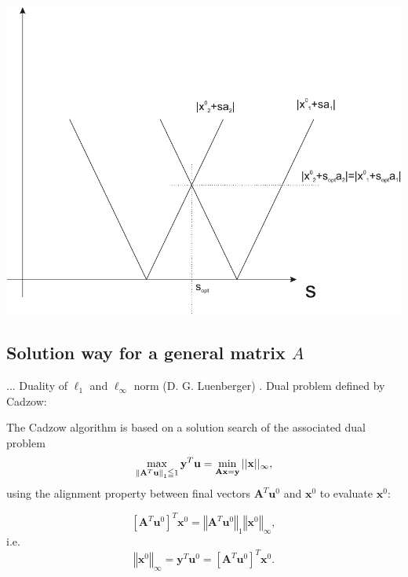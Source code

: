 \documentclass[journal]{IEEEtranTIE}
\theoremstyle{definition}
\begin{document}
\includegraphics[width=0.9\columnwidth]{Figures/ilust_obr_x0+sa}



\subsection{Solution way for a general matrix $A$}

... Duality of $\ell_{1}$ and $\ell_{\infty}$ norm (D. G. Luenberger)
\cite{Luenberger1997optimization}. Dual problem defined by Cadzow:

The Cadzow algorithm \cite{Cadzow1973,Cadzow1974efficient} is based
on a solution search of the associated dual problem 
\begin{equation}
\max_{\left\Vert \mathbf{A}^{T}\mathbf{u}\right\Vert _{1}\leqq1}\mathbf{y}^{T}\mathbf{u}=\min_{\mathbf{Ax}=\mathbf{y}}||\mathbf{x}||_{\text{\ensuremath{\infty}}},\label{eq:6}
\end{equation}
using the alignment property between final vectors $\mathbf{A}^{T}\mathbf{u}^{0}$
and $\mathbf{x}^{0}$ to evaluate $\mathbf{x}^{0}$:

\begin{equation}
\left[\mathbf{A}^{T}\mathbf{u}^{0}\right]^{T}\mathbf{x}^{0}=\left\Vert \mathbf{A}^{T}\mathbf{u}^{0}\right\Vert _{1}\left\Vert \mathbf{x}^{0}\right\Vert _{\infty},
\end{equation}
i.e. 
\begin{equation}
\left\Vert \mathbf{x}^{0}\right\Vert _{\infty}=\mathbf{y}^{T}\mathbf{u}^{0}=\left[\mathbf{A}^{T}\mathbf{u}^{0}\right]^{T}\mathbf{x}^{0}.
\end{equation}
\end{document}
